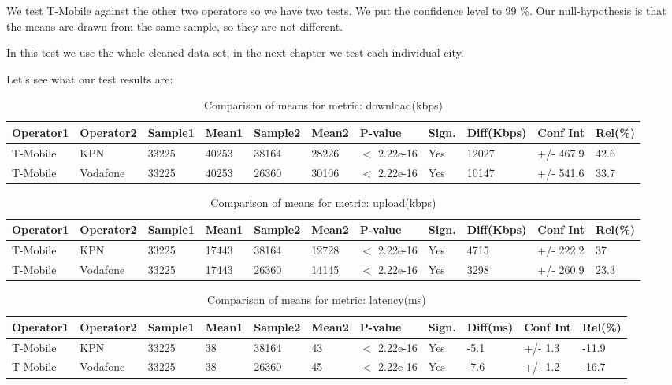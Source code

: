 \documentclass[]{article}
\begin{document}
We test T-Mobile against the other two operators so we have two tests.
We put the confidence level to 99 \%. Our null-hypothesis is that the
means are drawn from the same sample, so they are not different.

In this test we use the whole cleaned data set, in the next chapter we
test each individual city.

Let's see what our test results are:

\begin{table}[ht]
\centering
{\footnotesize
\begin{tabular}{lllllllllll}
  \hline
Operator1 & Operator2 & Sample1 & Mean1 & Sample2 & Mean2 & P-value & Sign. & Diff(Kbps) & Conf Int & Rel(\%) \\ 
  \hline
T-Mobile & KPN & 33225 & 40253 & 38164 & 28226 & $<$ 2.22e-16 & Yes & 12027 & +/- 467.9 & 42.6 \\ 
  T-Mobile & Vodafone & 33225 & 40253 & 26360 & 30106 & $<$ 2.22e-16 & Yes & 10147 & +/- 541.6 & 33.7 \\ 
   \hline
\end{tabular}
}
\caption{Comparison of means for metric: download(kbps)} 
\end{table}\begin{table}[ht]
\centering
{\footnotesize
\begin{tabular}{lllllllllll}
  \hline
Operator1 & Operator2 & Sample1 & Mean1 & Sample2 & Mean2 & P-value & Sign. & Diff(Kbps) & Conf Int & Rel(\%) \\ 
  \hline
T-Mobile & KPN & 33225 & 17443 & 38164 & 12728 & $<$ 2.22e-16 & Yes & 4715 & +/- 222.2 & 37 \\ 
  T-Mobile & Vodafone & 33225 & 17443 & 26360 & 14145 & $<$ 2.22e-16 & Yes & 3298 & +/- 260.9 & 23.3 \\ 
   \hline
\end{tabular}
}
\caption{Comparison of means for metric: upload(kbps)} 
\end{table}\begin{table}[ht]
\centering
{\footnotesize
\begin{tabular}{lllllllllll}
  \hline
Operator1 & Operator2 & Sample1 & Mean1 & Sample2 & Mean2 & P-value & Sign. & Diff(ms) & Conf Int & Rel(\%) \\ 
  \hline
T-Mobile & KPN & 33225 & 38 & 38164 & 43 & $<$ 2.22e-16 & Yes & -5.1 & +/- 1.3 & -11.9 \\ 
  T-Mobile & Vodafone & 33225 & 38 & 26360 & 45 & $<$ 2.22e-16 & Yes & -7.6 & +/- 1.2 & -16.7 \\ 
   \hline
\end{tabular}
}
\caption{Comparison of means for metric: latency(ms)} 
\end{table}
\end{document}
